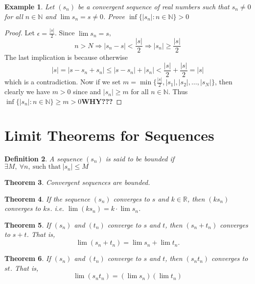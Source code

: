 \documentclass[12pt, lettersize]{book}
\newtheorem{thm}{Theorem}[section]
\newtheorem{dfn}[thm]{Definition}
\newtheorem{eg}[thm]{Example}
\begin{document}
		\begin{eg}
		Let $(s_n)$ be a convergent sequence of real numbers such that $s_n\neq0$ for all $n\in \mathbb{N}$ and $\lim s_n=s
		\neq0$. Prove $\inf\{|s_n|: n\in\mathbb{N}\}>0$
		\end{eg}
		\begin{proof}
		Let $\epsilon=\frac{|s|}{2}$. Since $\lim s_n=s$,
		\begin{displaymath}
			n>N \Rightarrow |s_n-s|<\frac{|s|}{2} \Rightarrow |s_n|\geq\frac{|s|}{2}
		\end{displaymath}
		The last implication is because otherwise 
		\begin{displaymath}
			|s|=|s-s_n+s_n|\leq|s-s_n|+|s_n|<\frac{|s|}{2}+\frac{|s|}{2}=|s|
		\end{displaymath}
		which is a contradiction. Now if we set $m=\min\{\frac{|s|}{2},|s_1|,|s_2|,\dots,|s_N|\}$, then clearly we have
		$m>0$ since and $|s_n|\geq m$ for all $n\in \mathbb{N}$. Thus $\inf\{|s_n|: n\in\mathbb{N}\}\geq m>0$\textbf{WHY???} 
		\end{proof}
		\newpage
		
	\section{Limit Theorems for Sequences}
		\begin{dfn}\label{def:bound}
		A sequence $(s_n)$ is said to be \emph{bounded} if $\exists M,\ \forall n,\ \text{such that}\ |s_n|\leq M$
		\end{dfn}
		
		\begin{thm}\label{def:convergence is bounded}
		Convergent sequences are bounded.
		\end{thm}
		
		\begin{thm}
		If the sequence $(s_n)$ converges to $s$ and $k\in\mathbb{R}$, then $(ks_n)$ converges to $ks$. i.e. $\lim(ks_n)=k\cdot\lim s_n$.
		\end{thm}
		
		\begin{thm}\label{def:addition}
		If $(s_n)$ and $(t_n)$ converge to $s$ and $t$, then $(s_n+t_n)$ converges to $s+t$. That is,
		\begin{displaymath}
			\lim(s_n+t_n)=\lim s_n+\lim t_n.
		\end{displaymath} 
		\end{thm}
	
		\begin{thm}\label{def:multiplication}
		If $(s_n)$ and $(t_n)$ converge to $s$ and $t$, then $(s_nt_n)$ converges to $st$. That is,
		\begin{displaymath}
			\lim(s_nt_n)=(\lim s_n)(\lim t_n)
		\end{displaymath} 
		\end{thm}
		
\end{document}
